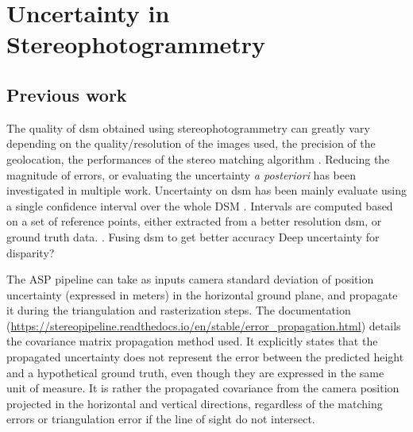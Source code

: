 \section{Uncertainty in Stereophotogrammetry}\label{sec:previous_work_stereo_uncertainty}
\subsection{Previous work}

The quality of \acrshort{dsm} obtained using stereophotogrammetry can greatly vary depending on the quality/resolution of the images used, the precision of the geolocation, the performances of the stereo matching algorithm \etc. Reducing the magnitude of errors, or evaluating the uncertainty \textit{a posteriori} has been investigated in multiple work.
Uncertainty on \acrshort{dsm} has been mainly evaluate using a single confidence interval over the whole DSM \cite{hugonnet_uncertainty_2022, deschamps-berger_apport_2021, wang_robust_2015, oksanen_digital_2006,panagiotakis_validation_2018}. Intervals are computed based on a set of reference points, either extracted from a better resolution \acrshort{dsm}, or ground truth data. . Fusing \acrshort{dsm} to get better accuracy \cite{qin_uncertainty-guided_2022}
\cite{hu_quantitative_2012,poggi_confidence_2021}
Deep uncertainty for disparity?

The ASP pipeline can take as inputs camera standard deviation of position uncertainty (expressed in meters) in the horizontal ground plane, and propagate it during the triangulation and rasterization steps. The documentation (\url{https://stereopipeline.readthedocs.io/en/stable/error_propagation.html}) details the covariance matrix propagation method used. It explicitly states that the propagated uncertainty does not represent the error between the predicted height and a hypothetical ground truth, even though they are expressed in the same unit of measure. It is rather the propagated covariance from the camera position projected in the horizontal and vertical directions, regardless of the matching errors or triangulation error if the line of sight do not intersect.

